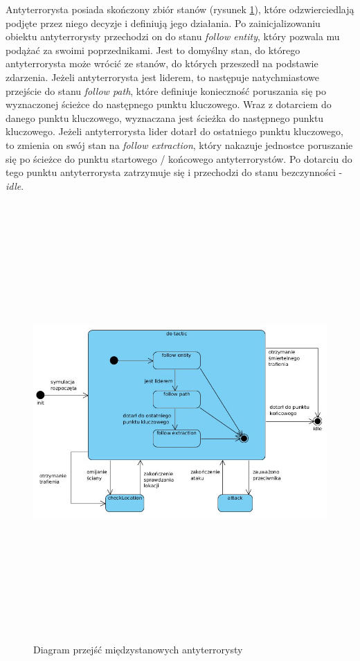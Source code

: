 Antyterrorysta posiada skończony zbiór stanów (rysunek \ref{atTacticImage}), które odzwierciedlają podjęte przez niego decyzje i definiują jego działania. Po zainicjalizowaniu obiektu antyterrorysty przechodzi on do stanu \emph{follow entity}, który pozwala mu podążać za swoimi poprzednikami. Jest to domyślny stan, do którego antyterrorysta może wrócić ze stanów, do których przeszedł na podstawie zdarzenia. Jeżeli antyterrorysta jest liderem, to następuje natychmiastowe przejście do stanu \emph{follow path}, które definiuje konieczność poruszania się po wyznaczonej ścieżce do następnego punktu kluczowego. Wraz z dotarciem do danego punktu kluczowego, wyznaczana jest ścieżka do następnego punktu kluczowego. Jeżeli antyterrorysta lider dotarł do ostatniego punktu kluczowego, to zmienia on swój stan na \emph{follow extraction}, który nakazuje jednostce poruszanie się po ścieżce do punktu startowego / końcowego antyterrorystów. Po dotarciu do tego punktu antyterrorysta zatrzymuje się i przechodzi do stanu bezczynności - \emph{idle}.

\begin{figure}
\begin{center}
	\includegraphics[width=160mm,height=167mm]{images/atTactic}
	\caption{Diagram przejść międzystanowych antyterrorysty\label{atTacticImage}}
\end{center}
\end{figure}

